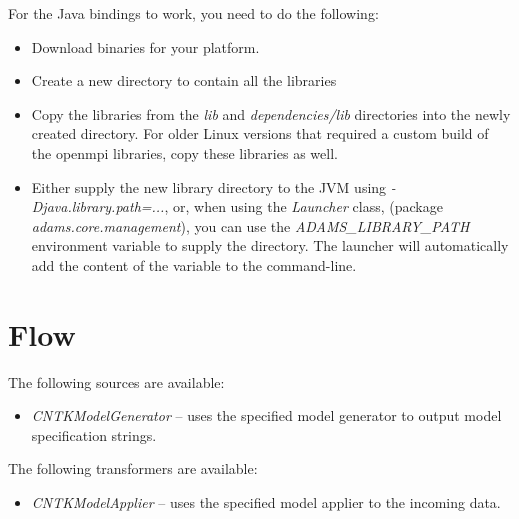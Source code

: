 \documentclass[a4paper]{book}
\begin{document}
\noindent For the Java bindings to work, you need to do the following:
\begin{itemize}
  \item Download binaries for your platform.
  \item Create a new directory to contain all the libraries
  \item Copy the libraries from the \textit{lib} and \textit{dependencies/lib}
  directories into the newly created directory. For older Linux versions that
  required a custom build of the openmpi libraries, copy these libraries as well.
  \item Either supply the new library directory to the JVM using
  \textit{-Djava.library.path=...}, or, when using the \textit{Launcher} class,
  (package \textit{adams.core.management}), you can use the
  \textit{ADAMS\_LIBRARY\_PATH} environment variable to supply the directory.
  The launcher will automatically add the content of the variable to the
  command-line.
\end{itemize}


\chapter{Flow}
The following sources are available:
\begin{itemize}
  \item \textit{CNTKModelGenerator} -- uses the specified model generator
  to output model specification strings.
\end{itemize}
The following transformers are available:
\begin{itemize}
  \item \textit{CNTKModelApplier} -- uses the specified model applier to the
  incoming data.
\end{itemize}



\end{document}
